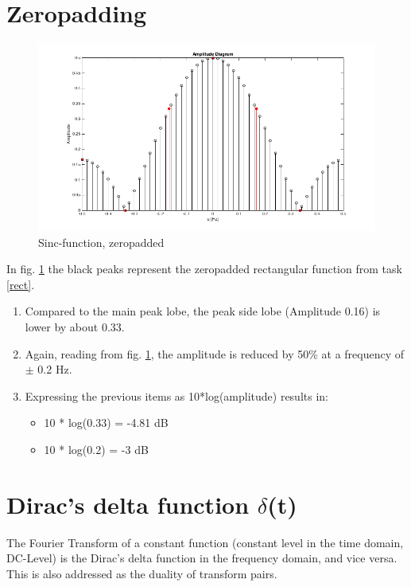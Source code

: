 \documentclass[12pt]{article}
\begin{document}
\section{Zeropadding}

\begin{figure}[h!]
	\centering
	\includegraphics[width=\linewidth]{images/ass1_8_9}	
	\caption{Sinc-function, zeropadded}
	\label{fig:mirror}
\end{figure}

In fig. \ref{fig:mirror} the black peaks represent the zeropadded rectangular function from task \ref{rect}.

\begin{enumerate}[label=\alph*)]
	\item Compared to the main peak lobe, the peak side lobe (Amplitude 0.16) is lower by about 0.33.
	\item Again, reading from fig. \ref{fig:mirror}, the amplitude is reduced by 50\% at a frequency of $\pm$ 0.2 Hz.
	\item Expressing the previous items as 10*log(amplitude) results in: 
	\begin{itemize}
		\item 10 * log(0.33) = -4.81 dB
		\item 10 * log(0.2)  = -3 dB
	\end{itemize}
\end{enumerate}


\section{Dirac’s delta function $\delta$(t)}
The Fourier Transform of a constant function (constant level in the time domain, DC-Level) is the Dirac's delta function in the frequency domain, and vice versa. This is also addressed as the duality of transform pairs.
\end{document}
